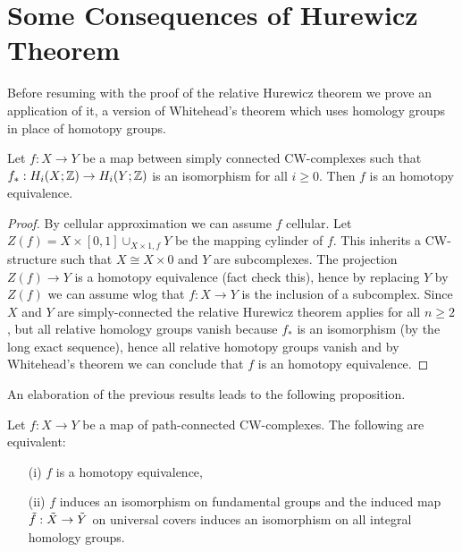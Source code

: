 
\section{Some Consequences of Hurewicz Theorem}


Before resuming with the proof of the relative Hurewicz theorem we prove an application of it, a version of Whitehead's theorem which uses homology groups in place of homotopy groups.

\begin{theorem}\label{theorem:homology-whitehead}
Let $f:X\to Y$ be a map between simply connected CW-complexes such that $f_*:H_i(X;{\mathbb Z})\to H_i(Y;{\mathbb Z})$ is an isomorphism for all $i\geq 0$. Then $f$ is an homotopy equivalence.
\end{theorem}

\begin{proof}
By cellular approximation we can assume $f$ cellular. Let $Z(f)=X\times[0,1]\cup_{X\times1, f}Y$ be the mapping cylinder of $f$. This inherits a CW-structure such that $X\cong X\times0$ and $Y$ are subcomplexes. The projection $Z(f)\to Y$ is a homotopy equivalence (fact check this), hence by replacing $Y$ by $Z(f)$ we can assume wlog that $f:X\to Y$ is the inclusion of a subcomplex. Since $X$ and $Y$ are simply-connected the relative Hurewicz theorem applies for all $n\geq2$, but all relative homology groups vanish because $f_*$ is an isomorphism (by the long exact sequence), hence all relative homotopy groups vanish and by Whitehead's theorem we can conclude that $f$ is an homotopy equivalence.
\end{proof}

An elaboration of the previous results leads to the following proposition.

\begin{proposition}
Let $f:X\to Y$ be a map of path-connected CW-complexes. The following are equivalent:
\begin{itemize}
    \item[(i)] $f$ is a homotopy equivalence,
    \item[(ii)] $f$ induces an isomorphism on fundamental groups and the induced map $\tilde{f}:\tilde{X}\to\tilde{Y}$ on universal covers induces an isomorphism on all integral homology groups.
\end{itemize}
\end{proposition}

